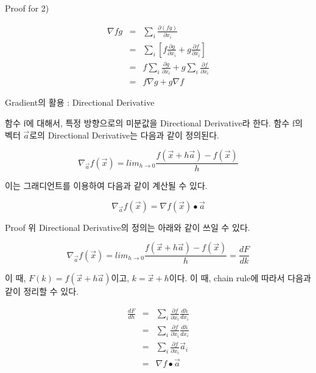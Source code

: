 \documentclass{beamer}
\begin{document}
\begin{frame}{Proof for 2)} 

\begin{eqnarray} 
\nabla fg &=& \sum_i \frac{\partial (fg)}{\partial x_i} \\ 
&=&  \sum_i [f\frac{\partial g}{\partial x_i} +  g\frac{\partial f}{\partial x_i} ]\\
&=&  f \sum_i \frac{\partial g}{\partial x_i} +  g \sum_i \frac{\partial f}{\partial x_i} \\
&=& f \nabla g + g \nabla f
\end{eqnarray}

\end{frame}

\begin{frame}{Gradient의 활용 : Directional Derivative} 

함수 f에 대해서, 특정 방향으로의 미분값을 Directional Derivative라 한다. 함수 f의 벡터 $\vec{a}$로의 Directional Derivative는 다음과 같이 정의된다. 

\begin{equation} 
\nabla_{\vec{a}} f(\vec{x}) = lim_{h \rightarrow 0} \frac{f(\vec{x} + h \vec{a}) - f(\vec{x})}{h}
\end{equation}

이는 그래디언트를 이용하여 다음과 같이 계산될 수 있다. 

\begin{equation} 
\nabla_{\vec{a}}f(\vec{x}) = \nabla f(\vec{x}) \bullet \vec{a}
\end{equation} 

\end{frame}


\begin{frame}{Proof} 
위 Directional Derivative의 정의는 아래와 같이 쓰일 수 있다. 

\begin{equation} 
\nabla_{\vec{a}} f(\vec{x}) = lim_{h \rightarrow 0} \frac{f(\vec{x} + h \vec{a}) - f(\vec{x})}{h} = \frac{dF}{dk}
\end{equation}

이 때, $F(k) = f(\vec{x} + h\vec{a})$이고, $k = \vec{x} + h$이다. 이 때, chain rule에 따라서 다음과 같이 정리할 수 있다. 

\begin{eqnarray} 
\frac{dF}{dh} &=& \sum_i \frac{\partial f}{\partial x_i} \frac{dh}{dx_i} \\ 
&=& \sum_i \frac{\partial f}{\partial x_i} \frac{dh}{dx_i} \\
&=& \sum_i \frac{\partial f}{\partial x_i} \vec{a}_i \\
&=& \nabla f \bullet \vec{a} 
\end{eqnarray}

\end{frame}
\end{document}
